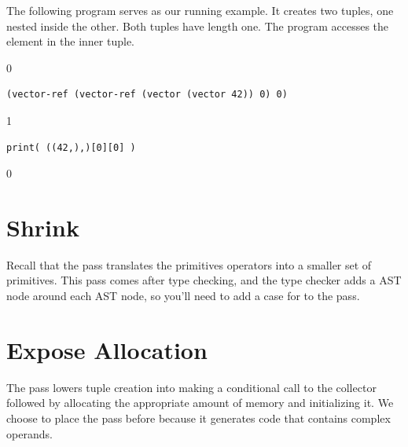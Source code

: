 \documentclass[7x10]{TimesAPriori_MIT}%
\def\racketEd{0}
\def\pythonEd{1}
\def\edition{0}
\numberwithin{theorem}{chapter}
\numberwithin{definition}{chapter}
\numberwithin{equation}{chapter}
\begin{document}
The following program serves as our running example.  It creates
two tuples, one nested inside the other. Both tuples have length
one. The program accesses the element in the inner tuple.
{\if\edition\racketEd
\begin{lstlisting}
(vector-ref (vector-ref (vector (vector 42)) 0) 0)
\end{lstlisting}
\fi}
{\if\edition\pythonEd
\begin{lstlisting}
print( ((42,),)[0][0] )
\end{lstlisting}
\fi}


{\if\edition\racketEd
\section{Shrink}
\label{sec:shrink-Lvec}

Recall that the  pass translates the primitives operators
into a smaller set of primitives.
%
This pass comes after type checking, and the type checker adds a
 AST node around each  AST node, so you'll
need to add a case for  to the  pass.

\fi}

\section{Expose Allocation}
\label{sec:expose-allocation}

The pass  lowers tuple creation into making a
conditional call to the collector followed by allocating the
appropriate amount of memory and initializing it.  We choose to place
the  pass before
 because it generates
code that contains complex operands.
\end{document}
